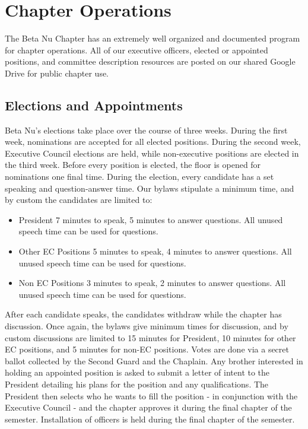 \chapter{Chapter Operations}

  The Beta Nu Chapter has an extremely well organized and documented program for chapter operations. All of our executive officers, elected or appointed positions, and committee description resources are posted on our shared Google Drive for public chapter use.
  
  \section*{Elections and Appointments}
    Beta Nu's elections take place over the course of three weeks. During the first week, nominations are accepted for all elected positions. During the second week, Executive Council elections are held, while non-executive positions are elected in the third week. Before every position is elected, the floor is opened for nominations one final time. During the election, every candidate has a set speaking and question-answer time. Our bylaws stipulate a minimum time, and by custom the candidates are limited to:
    
    \begin{itemize}
    	\item President 
	  7 minutes to speak, 5 minutes to answer questions. All unused speech time
	  can be used for questions.
	  
	\item Other EC Positions
	  5 minutes to speak, 4 minutes to answer questions. All unused speech time can
	  be used for questions.
	  
	\item Non EC Positions
	  3 minutes to speak, 2 minutes to answer questions. All unused speech time can
	  be used for questions.
    \end{itemize}
    
    After each candidate speaks, the candidates withdraw while the chapter has discussion. Once again, the bylaws give minimum times for discussion, and by custom discussions are limited to 15 minutes for President, 10 minutes for other EC positions, and 5 minutes for non-EC positions. Votes are done via a secret ballot collected by the Second Guard and the Chaplain. Any brother interested in holding an appointed position is asked to submit a letter of intent to the President detailing his plans for the position and any qualifications. The President then selects who he wants to fill the position - in conjunction with the Executive Council - and the chapter approves it during the final chapter of the semester. Installation of officers is held during the final chapter of the semester. 
    
